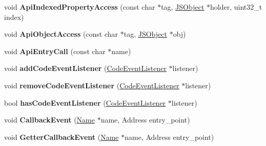 \begin{DoxyCompactItemize}
\item 
void {\bfseries Api\+Indexed\+Property\+Access} (const char $\ast$tag, \hyperlink{classv8_1_1internal_1_1_j_s_object}{J\+S\+Object} $\ast$holder, uint32\+\_\+t index)\hypertarget{classv8_1_1internal_1_1_logger_afe8a98fc8134ed8a3daaa581a304986c}{}\label{classv8_1_1internal_1_1_logger_afe8a98fc8134ed8a3daaa581a304986c}

\item 
void {\bfseries Api\+Object\+Access} (const char $\ast$tag, \hyperlink{classv8_1_1internal_1_1_j_s_object}{J\+S\+Object} $\ast$obj)\hypertarget{classv8_1_1internal_1_1_logger_ad52311ceb7d9b9056b033850ff42f56d}{}\label{classv8_1_1internal_1_1_logger_ad52311ceb7d9b9056b033850ff42f56d}

\item 
void {\bfseries Api\+Entry\+Call} (const char $\ast$name)\hypertarget{classv8_1_1internal_1_1_logger_a1240868d15412e1543074364a1242dee}{}\label{classv8_1_1internal_1_1_logger_a1240868d15412e1543074364a1242dee}

\item 
void {\bfseries add\+Code\+Event\+Listener} (\hyperlink{classv8_1_1internal_1_1_code_event_listener}{Code\+Event\+Listener} $\ast$listener)\hypertarget{classv8_1_1internal_1_1_logger_a531e78bf922b282c17839302d48e7cfd}{}\label{classv8_1_1internal_1_1_logger_a531e78bf922b282c17839302d48e7cfd}

\item 
void {\bfseries remove\+Code\+Event\+Listener} (\hyperlink{classv8_1_1internal_1_1_code_event_listener}{Code\+Event\+Listener} $\ast$listener)\hypertarget{classv8_1_1internal_1_1_logger_a09f4eaee73f8d0cebf33e2cc1737fefb}{}\label{classv8_1_1internal_1_1_logger_a09f4eaee73f8d0cebf33e2cc1737fefb}

\item 
bool {\bfseries has\+Code\+Event\+Listener} (\hyperlink{classv8_1_1internal_1_1_code_event_listener}{Code\+Event\+Listener} $\ast$listener)\hypertarget{classv8_1_1internal_1_1_logger_a7482d3d2c94c5802c1907b74458d2241}{}\label{classv8_1_1internal_1_1_logger_a7482d3d2c94c5802c1907b74458d2241}

\item 
void {\bfseries Callback\+Event} (\hyperlink{classv8_1_1internal_1_1_name}{Name} $\ast$name, Address entry\+\_\+point)\hypertarget{classv8_1_1internal_1_1_logger_ace8960698b9b890935ccb6630bd192a8}{}\label{classv8_1_1internal_1_1_logger_ace8960698b9b890935ccb6630bd192a8}

\item 
void {\bfseries Getter\+Callback\+Event} (\hyperlink{classv8_1_1internal_1_1_name}{Name} $\ast$name, Address entry\+\_\+point)\hypertarget{classv8_1_1internal_1_1_logger_a21663c1573fb2e9bfec2e92ecc848c80}{}\label{classv8_1_1internal_1_1_logger_a21663c1573fb2e9bfec2e92ecc848c80}


\end{DoxyCompactItemize}
